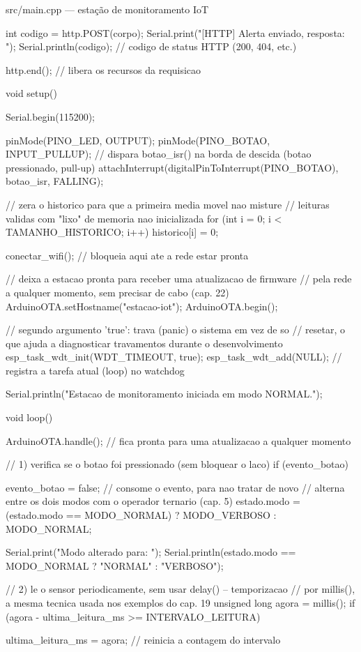 \begin{codigoc}{src/main.cpp — estação de monitoramento IoT}
{{    int codigo = http.POST(corpo);
    Serial.print("[HTTP] Alerta enviado, resposta: ");
    Serial.println(codigo);   // codigo de status HTTP (200, 404, etc.)

    http.end();   // libera os recursos da requisicao
}

void setup() {
    Serial.begin(115200);

    pinMode(PINO_LED, OUTPUT);
    pinMode(PINO_BOTAO, INPUT_PULLUP);
    // dispara botao_isr() na borda de descida (botao pressionado, pull-up)
    attachInterrupt(digitalPinToInterrupt(PINO_BOTAO), botao_isr, FALLING);

    // zera o historico para que a primeira media movel nao misture
    // leituras validas com "lixo" de memoria nao inicializada
    for (int i = 0; i < TAMANHO_HISTORICO; i++) {
        historico[i] = 0;
    }

    conectar_wifi();   // bloqueia aqui ate a rede estar pronta

    // deixa a estacao pronta para receber uma atualizacao de firmware
    // pela rede a qualquer momento, sem precisar de cabo (cap. 22)
    ArduinoOTA.setHostname("estacao-iot");
    ArduinoOTA.begin();

    // segundo argumento 'true': trava (panic) o sistema em vez de so
    // resetar, o que ajuda a diagnosticar travamentos durante o desenvolvimento
    esp_task_wdt_init(WDT_TIMEOUT, true);
    esp_task_wdt_add(NULL);   // registra a tarefa atual (loop) no watchdog

    Serial.println("Estacao de monitoramento iniciada em modo NORMAL.");
}

void loop() {
    ArduinoOTA.handle();   // fica pronta para uma atualizacao a qualquer momento

    // 1) verifica se o botao foi pressionado (sem bloquear o laco)
    if (evento_botao) {
        evento_botao = false;   // consome o evento, para nao tratar de novo
        // alterna entre os dois modos com o operador ternario (cap. 5)
        estado.modo = (estado.modo == MODO_NORMAL) ? MODO_VERBOSO : MODO_NORMAL;

        Serial.print("Modo alterado para: ");
        Serial.println(estado.modo == MODO_NORMAL ? "NORMAL" : "VERBOSO");
    }

    // 2) le o sensor periodicamente, sem usar delay() -- temporizacao
    //    por millis(), a mesma tecnica usada nos exemplos do cap. 19
    unsigned long agora = millis();
    if (agora - ultima_leitura_ms >= INTERVALO_LEITURA) {
        ultima_leitura_ms = agora;   // reinicia a contagem do intervalo

}}}
\end{codigoc}
